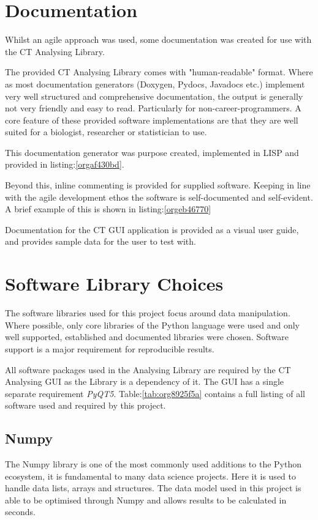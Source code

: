 \documentclass[11pt]{report}
\begin{document}
\section{Documentation}
\label{sec:org608c0ab}
Whilst an agile approach was used, some documentation was created for use with the CT Analysing Library.

The provided CT Analysing Library comes with "human-readable" format. Where as most documentation generators (Doxygen, Pydocs, Javadocs etc.) implement very well structured and comprehensive documentation, the output is generally not very friendly and easy to read. Particularly for non-career-programmers. A core feature of these provided software implementations are that they are well suited for a biologist, researcher or statistician to use.

This documentation generator was purpose created, implemented in LISP and provided in listing:\ref{orgaf430bd}.

Beyond this, inline commenting is provided for supplied software. Keeping in line with the agile development ethos the software is self-documented and self-evident. A brief example of this is shown in listing:\ref{orgeb46770}

Documentation for the CT GUI application is provided as a visual user guide, and provides sample data for the user to test with.
\section{Software Library Choices}
\label{sec:org256eeae}
The software libraries used for this project focus around data manipulation. Where possible, only core libraries of the Python language were used and only well supported, established and documented libraries were chosen. Software support is a major requirement for reproducible results.

All software packages used in the Analysing Library are required by the CT Analysing GUI as the Library is a dependency of it. The GUI has a single separate requirement \emph{PyQT5}.
Table:\ref{tab:org8925f5a} contains a full listing of all software used and required by this project.
\subsection{Numpy}
\label{sec:orgb9b1c6c}
The Numpy library is one of the most commonly used additions to the Python ecosystem, it is fundamental to many data science projects. Here it is used to handle data lists, arrays and structures. The data model used in this project is able to be optimised through Numpy and allows results to be calculated in seconds.
\end{document}
